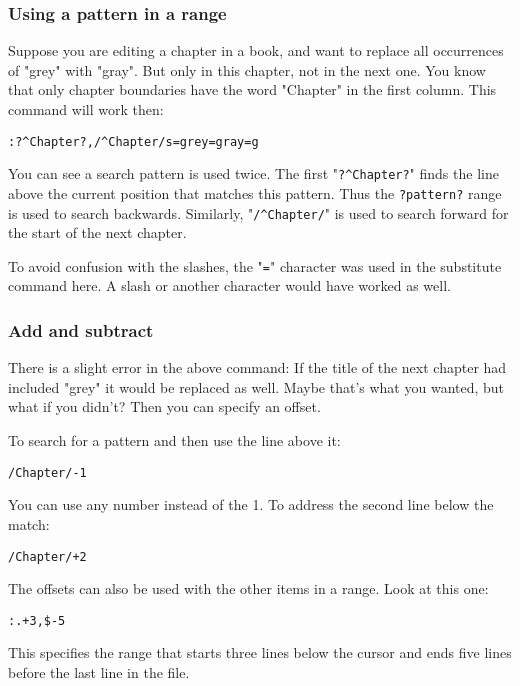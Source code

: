 \subsubsection{Using a pattern in a range}
Suppose you are editing a chapter in a book, and want to replace all occurrences of "grey" with "gray".
But only in this chapter, not in the next one.
You know that only chapter boundaries have the word "Chapter" in the first column.
This command will work then:

\begin{Verbatim}[samepage=true]
 :?^Chapter?,/^Chapter/s=grey=gray=g
\end{Verbatim}

You can see a search pattern is used twice.
The first "\verb!?^Chapter?!" finds the line above the current position that matches this pattern.
Thus the \verb!?pattern?! range is used to search backwards.
Similarly, "\verb!/^Chapter/!" is used to search forward for the start of the next chapter.

To avoid confusion with the slashes, the "\verb!=!" character was used in the substitute command here.
A slash or another character would have worked as well.
\subsubsection{Add and subtract}
There is a slight error in the above command: If the title of the next chapter had included "grey" it would be replaced as well.
Maybe that's what you wanted, but what if you didn't?  Then you can specify an offset.

To search for a pattern and then use the line above it:

\begin{Verbatim}[samepage=true]
 /Chapter/-1
\end{Verbatim}

You can use any number instead of the 1.
To address the second line below the match:

\begin{Verbatim}[samepage=true]
 /Chapter/+2
\end{Verbatim}

The offsets can also be used with the other items in a range.
Look at this one:

\begin{Verbatim}[samepage=true]
 :.+3,$-5
\end{Verbatim}

This specifies the range that starts three lines below the cursor and ends five lines before the last line in the file.
